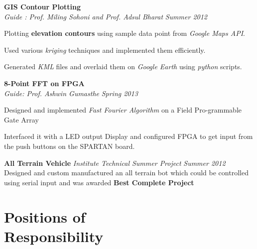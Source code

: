 \documentclass[margin,11pt]{resume}
\begin{document}
\begin{resume}
\textbf{GIS Contour Plotting}\\
  \textsl{Guide : Prof. Miling Sohoni and Prof. Adsul Bharat} \hfill \emph{Summer 2012}
\begin{list2}
\item Plotting \textbf{elevation contours} using sample data point from \emph{Google Maps API}.
\item Used various \emph{kriging} techniques and implemented them efficiently.
\item Generated \emph{KML} files and overlaid them on \emph{Google Earth} using \emph{python} scripts. \\
\end{list2}
\vspace{2mm}
\textbf{8-Point FFT on FPGA}\\ \textsl{Guide: Prof. Ashwin Gumasthe} \hfill \emph{Spring 2013}
\begin{list2}
\item Designed and implemented \emph{Fast Fourier Algorithm} on a Field Pro-grammable Gate Array 
\item Interfaced it with a LED output Display and configured FPGA to get input from the push buttons on the SPARTAN board.
\end{list2}

\textbf{All Terrain Vehicle} \hfill
\textsl{Institute Technical Summer Project} \hfill \emph{Summer 2012} \\ 
Designed and custom manufactured an all terrain bot which could be controlled using serial input and was awarded \textbf{Best Complete Project}



\section{\mysidestyle Positions of\\Responsibility } 



\end{resume}
\end{document}
